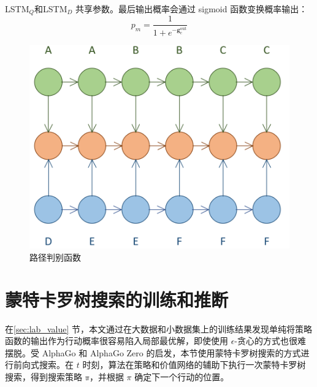 LSTM$_Q$和LSTM$_D$ 共享参数。最后输出概率会通过 sigmoid 函数变换概率输出：
\begin{equation}
\label{eq:classification_model}
p_m = \frac{1}{1+e^{-{\mathbf{g}_c^{\text{out}}}}}
\end{equation}

\begin{figure}[!htbp]
\vspace{1em}
\centering
  \includegraphics[width=0.4\linewidth]{figures/MCTS_path}
  \caption{路径判别函数}
  \label{fig:MCTS_path}       %
\vspace{1em}
\end{figure}

\section{蒙特卡罗树搜索的训练和推断}
\label{sec:MCTS_train}
在\ref{sec:lab_value} 节，本文通过在大数据和小数据集上的训练结果发现单纯将策略函数的输出作为行动概率很容易陷入局部最优解，即使使用 $\epsilon$-贪心的方式也很难摆脱。受 AlphaGo 和 AlphaGo Zero 的启发，本节使用蒙特卡罗树搜索的方式进行前向式搜索。在 $t$ 时刻，算法在策略和价值网络的辅助下执行一次蒙特卡罗树搜索，得到搜索策略 $\mathbb{\pi}$，并根据 $\pi$ 确定下一个行动的位置。

